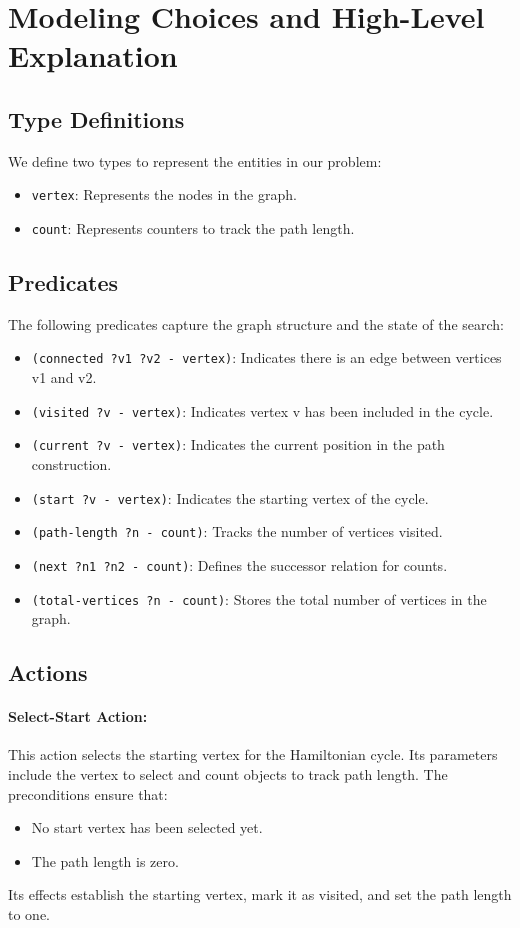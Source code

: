 \documentclass[a4paper,11pt]{article}
\begin{document}
\section{Modeling Choices and High-Level Explanation}
\subsection{Type Definitions}
We define two types to represent the entities in our problem:
\begin{itemize}
    \item \texttt{vertex}: Represents the nodes in the graph.
    \item \texttt{count}: Represents counters to track the path length.
\end{itemize}

\subsection{Predicates}
The following predicates capture the graph structure and the state of the search:
\begin{itemize}
    \item \texttt{(connected ?v1 ?v2 - vertex)}: Indicates there is an edge between vertices v1 and v2.
    \item \texttt{(visited ?v - vertex)}: Indicates vertex v has been included in the cycle.
    \item \texttt{(current ?v - vertex)}: Indicates the current position in the path construction.
    \item \texttt{(start ?v - vertex)}: Indicates the starting vertex of the cycle.
    \item \texttt{(path-length ?n - count)}: Tracks the number of vertices visited.
    \item \texttt{(next ?n1 ?n2 - count)}: Defines the successor relation for counts.
    \item \texttt{(total-vertices ?n - count)}: Stores the total number of vertices in the graph.
\end{itemize}

\subsection{Actions}
\paragraph{Select-Start Action:}  
This action selects the starting vertex for the Hamiltonian cycle. Its parameters include the vertex to select and count objects to track path length. The preconditions ensure that:
\begin{itemize}
    \item No start vertex has been selected yet.
    \item The path length is zero.
\end{itemize}
Its effects establish the starting vertex, mark it as visited, and set the path length to one.
\end{document}

